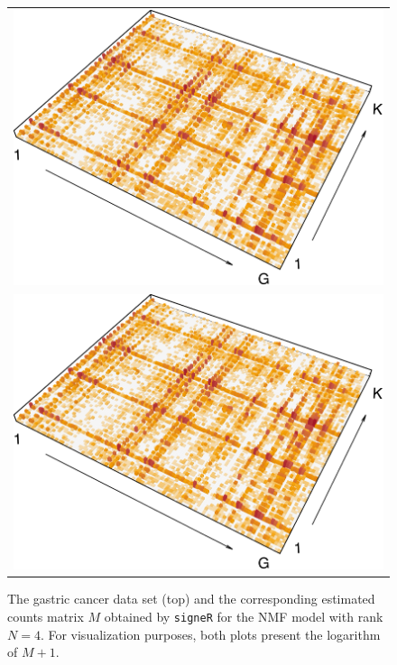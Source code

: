 \documentclass[11pt]{amsart}
\theoremstyle{definition}
\begin{document}
\begin{center}
\begin{figure}
 \begin{tabular}{c}
 \includegraphics[width=12cm]{sfigs/Mcur_lauren}
 \\
 \includegraphics[width=12cm]{sfigs/Mcur_lauren}
 \end{tabular}
 \caption{The gastric cancer data set (top) and the corresponding
estimated counts matrix $M$ obtained by \texttt{signeR} for the NMF
model with rank $N=4$. For visualization purposes, both plots present
the logarithm of $M+1$.
}\label{fig:gastriccancerDATA}
\end{figure}
\end{center}
\end{document}
